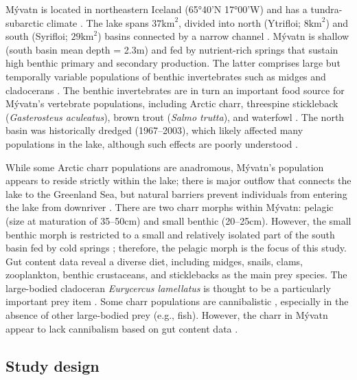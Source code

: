 \documentclass[11pt]{article}
\begin{document}
M\'{y}vatn is located in northeastern Iceland (65°40’N 17°00’W) 
and has a tundra-subarctic climate \citep{bjornsson2004climate, einarsson2004myvatn}. 
The lake spans $37 \text{km}^2$, 
divided into north (Ytrifloi; $8 \text{km}^2$) 
and south (Sy{\dh}rifloi; $29 \text{km}^2$) basins 
connected by a narrow channel \citep{einarsson2004myvatn}. 
M\'{y}vatn is shallow (south basin mean depth = 2.3m) and 
fed by nutrient-rich springs that sustain high benthic primary and secondary production.
The latter comprises large but temporally variable populations of benthic invertebrates 
such as midges and cladocerans \citep{einarsson2004clad, gardarsson2004population}.
The benthic invertebrates are in turn 
an important food source for M\'{y}vatn’s vertebrate populations, 
including Arctic charr, threespine stickleback (\emph{Gasterosteus aculeatus}), 
brown trout (\emph{Salmo trutta}), and waterfowl \citep{einarsson2004myvatn}. 
The north basin was historically dredged (1967--2003), 
which likely affected many populations in the lake, 
although such effects are poorly understood \citep{einarsson2004myvatn}.

While some Arctic charr populations are anadromous, 
M\'{y}vatn’s population appears to reside strictly within the lake; 
there is major outflow that connects the lake to the Greenland Sea,
but natural barriers prevent individuals from entering the lake from downriver
\citep{gudbergsson2004}. 
There are two charr morphs within M\'{y}vatn: pelagic (size at maturation of 35--50cm) 
and small benthic (20--25cm). 
However, the small benthic morph is restricted to a small 
and relatively isolated part of the south basin fed by cold springs 
\citep{gudbergsson2004}; 
therefore, the pelagic morph is the focus of this study. 
Gut content data reveal a diverse diet, including midges, snails, clams, zooplankton, 
benthic crustaceans, and sticklebacks as the main prey species. 
The large-bodied cladoceran \emph{Eurycercus lamellatus} 
is thought to be a particularly important prey item 
\citep{gudbergsson2004}. 
Some charr populations are cannibalistic \citep{klemetsen2003atlantic}, 
especially in the absence of other large-bodied prey (e.g., fish).
However, the charr in M\'{y}vatn appear to lack cannibalism based on gut content data
\citep{gudbergsson2004}. 

\subsection*{Study design} 
\end{document}
